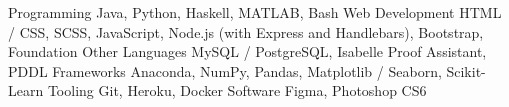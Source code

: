 \begin{cvskills}
  \cvskill
    {Programming} %
    {Java, Python, Haskell, MATLAB, Bash} %
  \cvskill
    {Web Development} %
    {HTML / CSS, SCSS, JavaScript, Node.js (with Express and Handlebars), Bootstrap, Foundation}
  \cvskill
    {Other Languages} %
    {MySQL / PostgreSQL, Isabelle Proof Assistant, PDDL}
  \cvskill
    {Frameworks} %
    {Anaconda, NumPy, Pandas, Matplotlib / Seaborn, Scikit-Learn}
  \cvskill
    {Tooling} %
    {Git, Heroku, Docker}
  \cvskill
    {Software} %
    {Figma, Photoshop CS6}
\end{cvskills}


